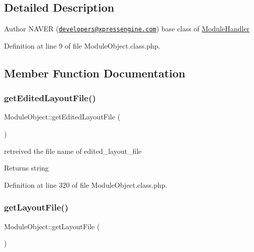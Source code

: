 \subsection{Detailed Description}
\begin{DoxyAuthor}{Author}
N\+A\+V\+ER (\href{mailto:developers@xpressengine.com}{\tt developers@xpressengine.\+com}) base class of \hyperlink{classModuleHandler}{Module\+Handler} 
\end{DoxyAuthor}


Definition at line 9 of file Module\+Object.\+class.\+php.



\subsection{Member Function Documentation}
\hypertarget{classModuleObject_a14fc83257a1518a1753c50cb11289c27}{}\label{classModuleObject_a14fc83257a1518a1753c50cb11289c27} 
\subsubsection{\texorpdfstring{get\+Edited\+Layout\+File()}{getEditedLayoutFile()}}
{\footnotesize\ttfamily Module\+Object\+::get\+Edited\+Layout\+File (\begin{DoxyParamCaption}{ }\end{DoxyParamCaption})}

retreived the file name of edited\+\_\+layout\+\_\+file \begin{DoxyReturn}{Returns}
string 
\end{DoxyReturn}


Definition at line 320 of file Module\+Object.\+class.\+php.

\hypertarget{classModuleObject_af446ac0f9c2a19c2629f30afd6271ec6}{}\label{classModuleObject_af446ac0f9c2a19c2629f30afd6271ec6} 
\subsubsection{\texorpdfstring{get\+Layout\+File()}{getLayoutFile()}}
{\footnotesize\ttfamily Module\+Object\+::get\+Layout\+File (\begin{DoxyParamCaption}{ }\end{DoxyParamCaption})}


